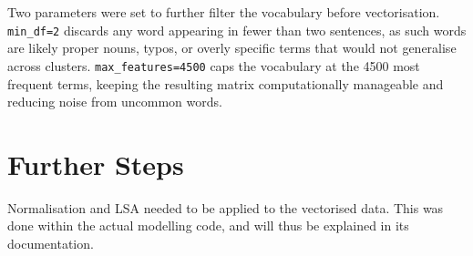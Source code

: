 \documentclass[11pt]{article}
\begin{document}
Two parameters were set to further filter the vocabulary before vectorisation. \texttt{min\_df=2} discards any word appearing in fewer than two sentences, as such words are likely proper nouns, typos, or overly specific terms that would not generalise across clusters. \texttt{max\_features=4500} caps the vocabulary at the 4500 most frequent terms, keeping the resulting matrix computationally manageable and reducing noise from uncommon words.

\section{Further Steps}
Normalisation and LSA needed to be applied to the vectorised data. This was done within the actual modelling code, and will thus be explained in its documentation.





\end{document}
